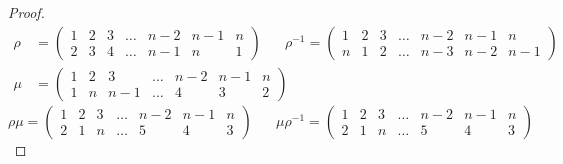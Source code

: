 \documentclass{article}
\newcommand{\twen}{\hspace{20pt}}
\theoremstyle{definition}
\begin{document}
\begin{proof}
    \begin{equation*}
        \begin{split}
            \rho&=\begin{pmatrix}
            1&2&3&\ldots&n-2&n-1&n\\2&3&4&\ldots&n-1&n&1
        \end{pmatrix}
        \twen \rho^{-1}=\begin{pmatrix}
            1&2&3&\ldots &n-2&n-1&n\\n&1&2&\ldots &n-3&n-2&n-1
        \end{pmatrix}
        \\\mu_{}&=\begin{pmatrix}
            1&2&3&\ldots&n-2&n-1&n\\1&n&n-1&\ldots&4&3&2
        \end{pmatrix}
        \end{split}
    \end{equation*}
    \begin{equation*}
        \rho \mu=\begin{pmatrix}
            1&2&3&\ldots &n-2&n-1&n\\2&1&n&\ldots&5&4&3
        \end{pmatrix} \twen \mu\rho^{-1}=\begin{pmatrix}
            1&2&3&\ldots&n-2&n-1&n\\ 2&1&n&\ldots & 5&4&3
        \end{pmatrix}
    \end{equation*}
\end{proof}
\end{document}
